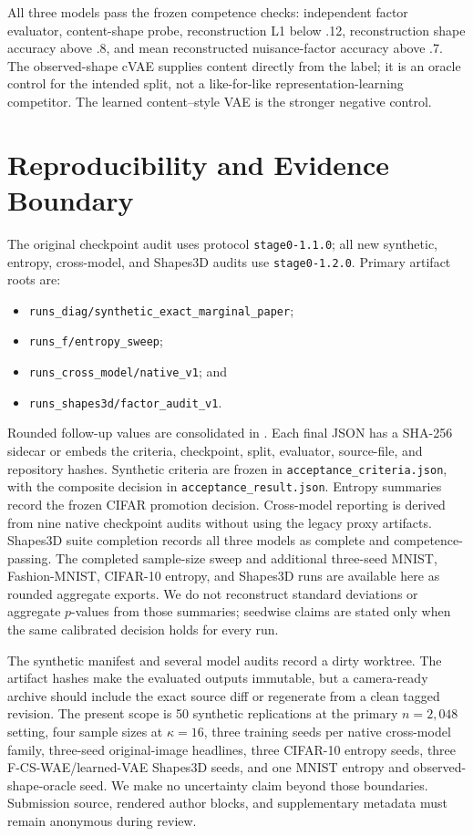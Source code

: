 All three models pass the frozen competence checks: independent factor
evaluator, content-shape probe, reconstruction L1 below .12, reconstruction
shape accuracy above .8, and mean reconstructed nuisance-factor accuracy
above .7.  The observed-shape cVAE supplies content directly from the label;
it is an oracle control for the intended split, not a like-for-like
representation-learning competitor.  The learned content--style VAE is the
stronger negative control.

\section{Reproducibility and Evidence Boundary}
\label{app:reproducibility}

The original checkpoint audit uses protocol \texttt{stage0-1.1.0}; all new
synthetic, entropy, cross-model, and Shapes3D audits use
\texttt{stage0-1.2.0}.  Primary artifact roots are:
\begin{itemize}
    \item \texttt{runs\_diag/synthetic\_exact\_marginal\_paper};
    \item \texttt{runs\_f/entropy\_sweep};
    \item \texttt{runs\_cross\_model/native\_v1}; and
    \item \texttt{runs\_shapes3d/factor\_audit\_v1}.
\end{itemize}
Rounded follow-up values are consolidated in
.
Each final JSON has a SHA-256 sidecar or embeds the criteria, checkpoint,
split, evaluator, source-file, and repository hashes.  Synthetic criteria are
frozen in \texttt{acceptance\_criteria.json}, with the composite decision in
\texttt{acceptance\_result.json}.  Entropy summaries record the frozen CIFAR
promotion decision.  Cross-model reporting is derived from nine native
checkpoint audits without using the legacy proxy artifacts.  Shapes3D suite
completion records all three models as complete and competence-passing.
The completed sample-size sweep and additional three-seed MNIST,
Fashion-MNIST, CIFAR-10 entropy, and Shapes3D runs are available here as
rounded aggregate exports.  We do not reconstruct standard deviations or
aggregate $p$-values from those summaries; seedwise claims are stated only
when the same calibrated decision holds for every run.

The synthetic manifest and several model audits record a dirty worktree.  The
artifact hashes make the evaluated outputs immutable, but a camera-ready
archive should include the exact source diff or regenerate from a clean tagged
revision.  The present scope is 50 synthetic replications at the primary
$n=2{,}048$ setting, four sample sizes at $\kappa=16$, three training seeds per
native cross-model family, three-seed original-image headlines, three
CIFAR-10 entropy seeds, three F-CS-WAE/learned-VAE Shapes3D seeds, and one
MNIST entropy and observed-shape-oracle seed.  We make no uncertainty claim
beyond those boundaries.  Submission source, rendered
author blocks, and supplementary metadata must remain anonymous during
review.
